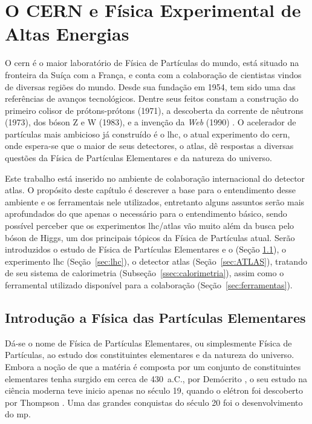 \chapter{O CERN e Física Experimental de Altas Energias}
\label{cap:cern}
\glsresetall


O \gls{cern} é o maior laboratório de Física de Partículas do mundo, 
está situado na fronteira da Suíça com
a França, e conta com a colaboração de cientistas vindos 
de diversas regiões do mundo. Desde sua fundação em 1954, tem sido uma das referências de
avanços tecnológicos. Dentre seus feitos constam a construção do primeiro 
colisor de prótons-prótons (1971), a descoberta 
da corrente de nêutrons (1973), dos bóson Z e W (1983), 
e a invenção da \emph{Web} (1990) \cite{webCERN}. O acelerador de partículas mais ambicioso 
\cite{Intro_Standard,Beiser} já construído é o \gls{lhc}, o atual experimento do
\gls{cern}, onde espera-se que o maior de seus 
detectores, o \gls{atlas}, dê respostas a diversas questões da Física de Partículas
Elementares e da natureza do universo.

Este trabalho está inserido no ambiente de colaboração internacional do detector
\gls{atlas}. O propósito deste capítulo é descrever a base para o entendimento desse ambiente
e os ferramentais nele utilizados, entretanto alguns assuntos serão mais
aprofundados do que apenas o necessário para o entendimento básico, sendo 
possível perceber que os experimentos \gls{lhc}/\gls{atlas} vão muito além 
da busca pelo bóson de Higgs, um dos principais tópicos da Física de Partículas atual. 
Serão introduzidos o estudo de Física de Partículas
Elementares e o  (Seção \ref{sec:fis_part}), 
o experimento \gls{lhc} (Seção~\ref{sec:lhc}), o detector
\gls{atlas} (Seção~\ref{sec:ATLAS}), tratando de seu sistema de calorimetria
(Subseção~\ref{ssec:calorimetria}), assim como o ferramental utilizado
disponível para a colaboração (Seção~\ref{sec:ferramentas}). 

\section{Introdução a Física das Partículas Elementares}
\label{sec:fis_part}

Dá-se o nome de Física de Partículas Elementares, ou simplesmente Física de
Partículas, ao estudo dos constituintes
elementares e da natureza do universo. Embora a noção de que a matéria é
composta por um conjunto de constituintes elementares tenha surgido em cerca de
430~a.C., por Demócrito \cite{democritos}, o seu estudo na ciência moderna teve inicio apenas 
no século 19, quando o elétron foi descoberto por Thompson \cite{thompson}.
Uma das grandes conquistas do século 20 foi o desenvolvimento do \gls{mp}.  


